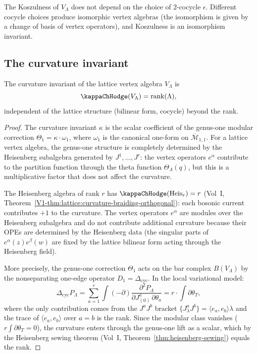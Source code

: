 \begin{remark}
The Koszulness of $V_\Lambda$ does not depend on the choice of
$2$-cocycle $\epsilon$. Different cocycle choices produce isomorphic
vertex algebras (the isomorphism is given by a change of basis of
vertex operators), and Koszulness is an isomorphism invariant.
\end{remark}

\subsection{The curvature invariant}

\begin{theorem}[$\kappaChHodge(V_\Lambda) = \mathrm{rank}(\Lambda)$;
\ClaimStatusProvedHere]
The curvature invariant of the lattice vertex algebra $V_\Lambda$ is
\[
\kappaChHodge(V_\Lambda) = \mathrm{rank}(\Lambda),
\]
independent of the lattice structure (bilinear form, cocycle) beyond
the rank.
\end{theorem}

\begin{proof}
The curvature invariant $\kappa$ is the scalar coefficient of the
genus-one modular correction $\Theta_1 = \kappa \cdot \omega_1$,
where $\omega_1$ is the canonical one-form on $\overline{\mathcal{M}}_{1,1}$.
For a lattice vertex algebra, the genus-one structure is completely
determined by the Heisenberg subalgebra generated by $J^1,\dots,J^r$:
the vertex operators $e^\alpha$ contribute to the partition function
through the theta function $\Theta_\Lambda(q)$, but this is a
multiplicative factor that does not affect the curvature.

The Heisenberg algebra of rank $r$ has
$\kappaChHodge(\mathrm{Heis}_r) = r$
(Vol~I, Theorem~\ref*{V1-thm:lattice:curvature-braiding-orthogonal}):
each bosonic current contributes $+1$ to the curvature.
The vertex operators $e^\alpha$ are modules over the Heisenberg
subalgebra and do not contribute additional curvature because
their OPEs are determined by the Heisenberg data (the singular
parts of $e^\alpha(z) e^\beta(w)$ are fixed by the lattice bilinear
form acting through the Heisenberg field).

More precisely, the genus-one correction $\Theta_1$ acts on
the bar complex $B(V_\Lambda)$ by the nonseparating one-edge
operator $D_1 = \Delta_{\mathrm{cyc}}$. In the local variational
model:
\[
\Delta_{\mathrm{cyc}} P_\Lambda
=
\sum_{a=1}^r \int (-\partial)\frac{\partial^2 P_\Lambda}
{\partial J^a_{(0)}\,\partial\theta_a}
=
r \cdot \int\partial\theta_T,
\]
where the only contribution comes from the $J^a J^b$ bracket
$\{J^a_\lambda J^b\} = \langle e_a,e_b\rangle\lambda$ and the
trace of $\langle e_a,e_b\rangle$ over $a=b$ is the rank.
Since the modular class vanishes ($r\int\partial\theta_T = 0$),
the curvature enters through the genus-one lift as a scalar, which
by the Heisenberg sewing theorem
(Vol~I, Theorem~\ref*{thm:heisenberg-sewing})
equals the rank.
\end{proof}

